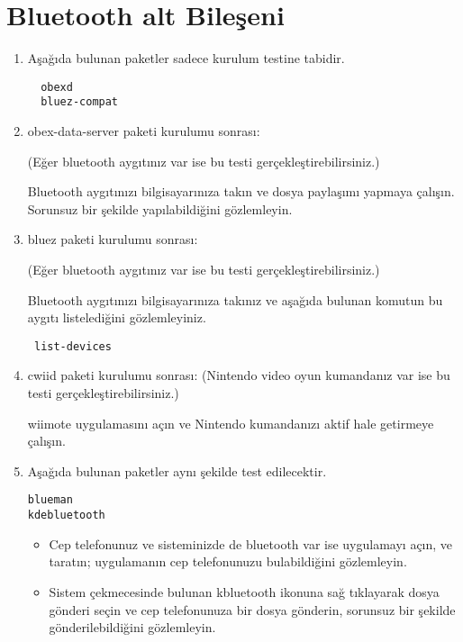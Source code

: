 \documentclass[a4paper,10pt]{article}
\begin{document}
\section{Bluetooth alt Bileşeni}
\begin{enumerate}
\item Aşağıda bulunan paketler sadece kurulum testine tabidir. 
\begin{verbatim}
  obexd
  bluez-compat
\end{verbatim}

 \item obex-data-server paketi kurulumu sonrası: 
 
(Eğer bluetooth aygıtınız var ise bu testi gerçekleştirebilirsiniz.)

Bluetooth aygıtınızı bilgisayarınıza takın ve dosya paylaşımı yapmaya çalışın. Sorunsuz bir şekilde yapılabildiğini gözlemleyin.
 \item bluez paketi kurulumu sonrası: 
 
(Eğer bluetooth aygıtınız var ise bu testi gerçekleştirebilirsiniz.)

Bluetooth aygıtınızı bilgisayarınıza takınız ve aşağıda bulunan komutun bu aygıtı listelediğini gözlemleyiniz.
\begin{verbatim}
 list-devices
\end{verbatim}

 \item cwiid paketi kurulumu sonrası: (Nintendo video oyun kumandanız var ise bu testi gerçekleştirebilirsiniz.)

wiimote uygulamasını açın ve Nintendo kumandanızı aktif hale getirmeye çalışın.

\item Aşağıda bulunan paketler aynı şekilde test edilecektir.
\begin{verbatim}
blueman
kdebluetooth 
\end{verbatim}

\begin{itemize}
 \item Cep telefonunuz ve sisteminizde de bluetooth var ise uygulamayı açın, ve taratın; uygulamanın cep telefonunuzu bulabildiğini gözlemleyin.

 \item Sistem çekmecesinde bulunan kbluetooth ikonuna sağ tıklayarak dosya gönderi seçin ve cep telefonunuza bir dosya gönderin, sorunsuz bir şekilde gönderilebildiğini gözlemleyin.

\end{itemize}

\end{enumerate}
\end{document}
